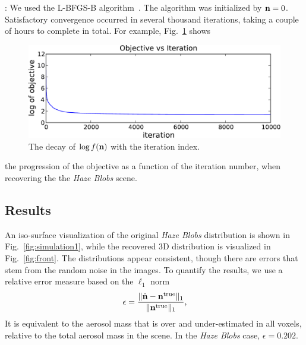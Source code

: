 \documentclass[10pt,twocolumn,letterpaper]{article}
\begin{document}
: We used the L-BFGS-B algorithm~\cite{BFGS}. The algorithm was initialized by ${\bf n}=0$. Satisfactory convergence occurred in several thousand iterations, taking a couple of hours to complete in total. For example, Fig.~\ref{fig:objective} shows
\begin{figure}[t]
  \centering
  \includegraphics[width=\columnwidth]{images/objective.pdf}
  \caption{\small The decay of $\log f({\bf n})$ with the iteration index.}
  \label{fig:objective}
\end{figure}
the progression of the objective as a function of the iteration number, when recovering the the {\em Haze Blobs} scene.


\subsection{Results}
\label{sec:optimization-results}

An iso-surface visualization of the original {\em Haze Blobs} distribution is shown in
Fig.~\ref{fig:simulation1}, while the recovered 3D distribution is visualized in
Fig.~\ref{fig:front}. The distributions appear consistent, though there are errors that stem from the random noise in the images. To quantify the results, we use a relative  error measure based on the $\ell_1$ norm
\begin{equation}
  \label{eq:ndiff}
  \epsilon=\frac{\| \hat{\bf n}  - {\bf n}^{\rm true} \|_1}
             {\| {\bf n}^{\rm true} \|_1} ,
  \hspace{-0.05cm}
\end{equation}
It is equivalent to the aerosol mass that is over and under-estimated in all voxels, relative to the total aerosol mass in the scene.
In the {\em Haze Blobs} case, $\epsilon=0.202$.
\end{document}
